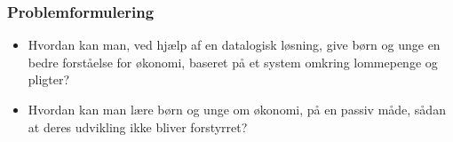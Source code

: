 
\begin{frame}
\frametitle{Problemformulering}
    \begin{itemize}
        \item{Hvordan kan man, ved hjælp af en datalogisk løsning, give børn og unge en bedre forståelse for økonomi, baseret på et system omkring lommepenge og pligter?}
        \item{Hvordan kan man lære børn og unge om økonomi, på en passiv måde, sådan at deres udvikling ikke bliver forstyrret?}
    \end{itemize}
\end{frame}
   

